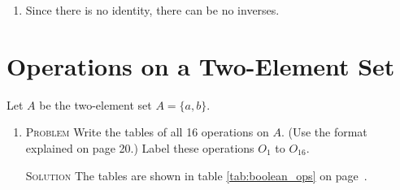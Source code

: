\documentclass{amsart}
\newcommand{\Solution}{\textsc{Solution}\xspace}
\newcommand{\Problem}{\textsc{Problem}\xspace}
\begin{document}
\begin{enumerate}
\begin{enumerate}
      \item Since there is no identity, there can be no inverses.
   \end{enumerate}

\end{enumerate}

\section{Operations on a Two-Element Set}
Let $A$ be the two-element set $A = \{a,b\}$.
\begin{enumerate}
   \item \Problem Write the tables of all 16 operations on $A$. (Use the format
   explained on page 20.) Label these operations $O_1$ to $O_{16}$. 

   \noindent \Solution The tables are shown in table \ref{tab:boolean_ops} on 
   page~\pageref{tab:boolean_ops}.


\end{enumerate}
\end{document}
